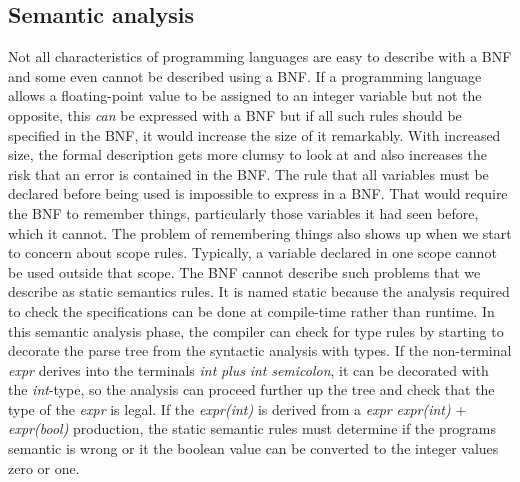 \subsection{Semantic analysis}
Not all characteristics of programming languages are easy to describe with a BNF and some even cannot be described using a BNF. If a programming language allows a floating-point value to be assigned to an integer variable but not the opposite, this \textit{can} be expressed with a BNF but if all such rules should be specified in the BNF, it would increase the size of it remarkably. With increased size, the formal description gets more clumsy to look at and also increases the risk that an error is contained in the BNF.
The rule that all variables must be declared before being used is impossible to express in a BNF. That would require the BNF to remember things, particularly those variables it had seen before, which it cannot. The problem of remembering things also shows up when we start to concern about scope rules. Typically, a variable declared in one scope cannot be used outside that scope. The BNF cannot describe such problems that we describe as static semantics rules. It is named static because the analysis required to check the specifications can be done at compile-time rather than runtime\cite[p. 153]{sebesta2013}.
In this semantic analysis phase, the compiler can check for type rules by starting to decorate the parse tree from the syntactic analysis with types. If the non-terminal \textit{expr} derives into the terminals \textit{int} \textit{plus} \textit{int} \textit{semicolon}, it can be decorated with the \textit{int}-type, so the analysis can proceed further up the tree and check that the type of the \textit{expr} is legal. If the \textit{expr(int)} is derived from a \textit{expr} \rightarrow \textit{expr(int)} +  \textit{expr(bool)} production, the static semantic rules must determine if the programs semantic is wrong or it the boolean value can be converted to the integer values zero or one.

